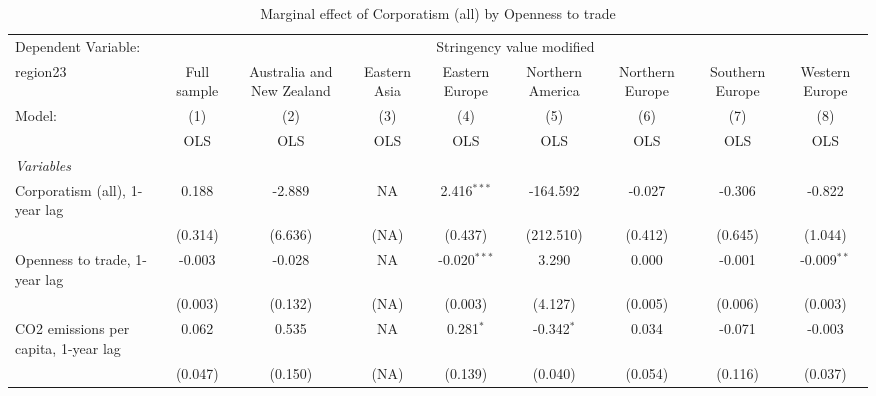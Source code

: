 
\begin{table}[htbp]
   \caption{Marginal effect of Corporatism (all) by Openness to trade}
   \centering
   \begin{tabular}{lcccccccc}
      \toprule
      Dependent Variable: & \multicolumn{8}{c}{Stringency value modified}\\
      region23                                                      & Full sample   & Australia and New Zealand & Eastern Asia & Eastern Europe & Northern America & Northern Europe & Southern Europe & Western Europe \\   
      Model:                                                        & (1)           & (2)                       & (3)          & (4)            & (5)              & (6)             & (7)             & (8)\\  
                                                                    &  OLS          & OLS                       & OLS          & OLS            & OLS              & OLS             & OLS             & OLS\\  
      \midrule
      \emph{Variables}\\
      Corporatism (all), 1-year lag                                 & 0.188         & -2.889                    & NA           & 2.416$^{***}$  & -164.592         & -0.027          & -0.306          & -0.822\\   
                                                                    & (0.314)       & (6.636)                   & (NA)         & (0.437)        & (212.510)        & (0.412)         & (0.645)         & (1.044)\\   
      Openness to trade, 1-year lag                                 & -0.003        & -0.028                    & NA           & -0.020$^{***}$ & 3.290            & 0.000           & -0.001          & -0.009$^{**}$\\   
                                                                    & (0.003)       & (0.132)                   & (NA)         & (0.003)        & (4.127)          & (0.005)         & (0.006)         & (0.003)\\   
      CO2 emissions per capita, 1-year lag                          & 0.062         & 0.535                     & NA           & 0.281$^{*}$    & -0.342$^{*}$     & 0.034           & -0.071          & -0.003\\   
                                                                    & (0.047)       & (0.150)                   & (NA)         & (0.139)        & (0.040)          & (0.054)         & (0.116)         & (0.037)\\   

\end{tabular}
\end{table}
